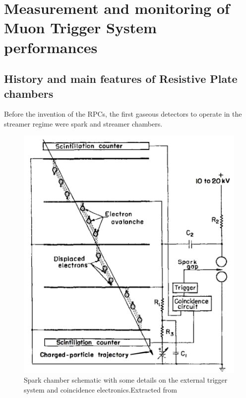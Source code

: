 \chapter{Measurement and monitoring of Muon Trigger System performances}

\section{History and main features of Resistive Plate chambers}
Before the invention of the RPCs, the first gaseous detectors to operate in the streamer regime were spark and streamer chambers.

\begin{figure}[!t]
\begin{center}
\includegraphics[width=0.95\linewidth]{Chapters/Performance/Figs/spark-chambers.pdf}
\caption{Spark chamber schematic with some details on the external trigger system and coincidence electronics.Extracted from \cite{wenzel:1966}}
\label{fig:SparkChamber}
\end{center}
\end{figure}


